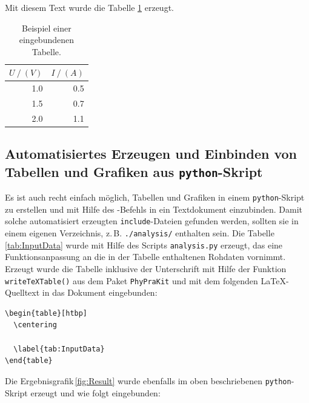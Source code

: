 \documentclass[a4paper,10pt]{article}
\begin{document}
Mit diesem Text wurde die Tabelle \ref{tab:tabelle1} erzeugt.  
\begin{table}[htbp]
  \centering
     \begin{tabular}{rr}
	\toprule
	$U ~/~ (V)$ & $I ~/~ (A)$\\
	\midrule
         1.0 & 0.5 \\
         1.5 & 0.7 \\
         2.0 & 1.1 \\
	\bottomrule
      \end{tabular}
    \caption{Beispiel einer eingebundenen Tabelle.}
    \label{tab:tabelle1}
\end{table}

\newpage

\subsection{Automatisiertes Erzeugen und Einbinden von Tabellen und Grafiken aus \texttt{python}-Skript}

Es ist auch recht einfach möglich, Tabellen und Grafiken
in einem \verb|python|-Skript zu erstellen und mit Hilfe des
\verb||-Befehls in ein Textdokument einzubinden.
Damit solche automatisiert erzeugten \texttt{include}-Dateien
gefunden werden, sollten sie in einem eigenen Verzeichnis,
z.\,B. \texttt{./analysis/} enthalten sein.
Die Tabelle\,\ref{tab:InputData} wurde mit Hilfe des Scripts
\verb|analysis.py| erzeugt, das eine Funktionsanpassung
an die in der Tabelle enthaltenen Rohdaten vornimmt. 
Erzeugt wurde die Tabelle inklusive der Unterschrift mit Hilfe der
Funktion \verb|writeTeXTable()| aus dem Paket \verb|PhyPraKit|
und mit dem folgenden \LaTeX-Quelltext in das Dokument eingebunden:

\begin{verbatim}
\begin{table}[htbp]
  \centering
  
  \label{tab:InputData}
\end{table}
\end{verbatim}

\begin{table}[htbp]
  \centering
  
  \label{tab:InputData}
\end{table}

Die Ergebnisgrafik\,\ref{fig:Result} wurde ebenfalls im oben beschriebenen
\texttt{python}-Skript erzeugt und wie folgt eingebunden:
\end{document}
